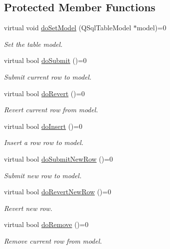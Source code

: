 \subsection*{Protected Member Functions}
\begin{DoxyCompactItemize}
\item 
virtual void \hyperlink{classmdt_abstract_sql_widget_aad8608a92f65790c99ca7897fbd48c30}{doSetModel} (QSqlTableModel $\ast$model)=0
\begin{DoxyCompactList}\small\item\em Set the table model. \end{DoxyCompactList}\item 
virtual bool \hyperlink{classmdt_abstract_sql_widget_a7a97e9c9f3b9c22650e4b55d095543ef}{doSubmit} ()=0
\begin{DoxyCompactList}\small\item\em Submit current row to model. \end{DoxyCompactList}\item 
virtual bool \hyperlink{classmdt_abstract_sql_widget_a2c0cbbcd02be19767e68153ecbc2392d}{doRevert} ()=0
\begin{DoxyCompactList}\small\item\em Revert current row from model. \end{DoxyCompactList}\item 
virtual bool \hyperlink{classmdt_abstract_sql_widget_aa79059c092c6bcda569ced7c0621a817}{doInsert} ()=0
\begin{DoxyCompactList}\small\item\em Insert a row row to model. \end{DoxyCompactList}\item 
virtual bool \hyperlink{classmdt_abstract_sql_widget_ac546802e2910fc49c007eda5dbb3b3f7}{doSubmitNewRow} ()=0
\begin{DoxyCompactList}\small\item\em Submit new row to model. \end{DoxyCompactList}\item 
virtual bool \hyperlink{classmdt_abstract_sql_widget_a048efd5f89be7c6e74d6988b7e95fc07}{doRevertNewRow} ()=0
\begin{DoxyCompactList}\small\item\em Revert new row. \end{DoxyCompactList}\item 
virtual bool \hyperlink{classmdt_abstract_sql_widget_a41c30652fa9775c7b3bc6cb51004d4d5}{doRemove} ()=0
\begin{DoxyCompactList}\small\item\em Remove current row from model. \end{DoxyCompactList}\item 

\end{DoxyCompactItemize}
